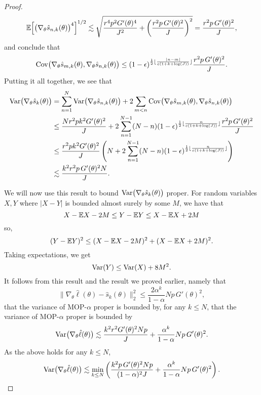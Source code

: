 \begin{proof}
\begin{equation}
\mathbb{E}\Big[\big(\nabla_\theta\hat s_{n,k}(\theta)\big)^4\Big]^{1/2} \lesssim  \sqrt{\frac{r^4p^2G'(\theta)^4}{J^2}+\left(\frac{r^2p \, G'(\theta)^2}{J}\right)^2} = \frac{r^2p \, G'(\theta)^2}{J},
\end{equation}
and conclude that 
\begin{equation}\mathrm{Cov}\big(\nabla_\theta\hat s_{m,k}(\theta), \nabla_\theta\hat s_{n,k}(\theta)\big) \leq (1-\epsilon)^{\frac{1}{2}\lfloor \frac{|n-m|}{c(1+k+\log(J))} \rfloor}\frac{r^2p \, G'(\theta)^2}{J}.\end{equation}
Putting it all together, we see that
\begin{align}
    \mathrm{Var}\big(\nabla_\theta \hat s_{k}(\theta)\big) &= \sum_{n=1}^N \mathrm{Var}\big(\nabla_\theta\hat s_{n,k}(\theta)\big) + 2\sum_{m<n} \mathrm{Cov}\big(\nabla_\theta\hat s_{m,k}(\theta),\nabla_\theta\hat s_{n,k}(\theta)\big)
    \\
    &\leq \frac{Nr^2pk^2G'(\theta)^2}{J} + 2\sum_{n=1}^{N-1} (N-n)(1-\epsilon)^{\frac{1}{2}\lfloor \frac{n}{c(1+k+\log(J))} \rfloor}\frac{r^2p \, G'(\theta)^2}{J} 
    \\
    &\leq \frac{r^2pk^2G'(\theta)^2}{J} \left(N + 2\sum_{n=1}^{N-1} (N-n) (1-\epsilon)^{\frac{1}{2}\lfloor \frac{n}{c(1+k+\log(J))} \rfloor}\right) 
    \\
    &\lesssim \frac{k^2r^2p \, G'(\theta)^2N}{J}.
\end{align}

We will now use this result to bound $\mathrm{Var}\big(\nabla_\theta \hat s_k(\theta)\big)$ proper. 
For random variables $X,Y$ where $|X-Y|$ is bounded almost surely by some $M$, we have that 
\begin{equation}
X-\mathbb{E} X - 2M \leq Y - \mathbb{E} Y \leq X - \mathbb{E} X + 2M\end{equation}
so,
\begin{equation}
(Y-\mathbb{E} Y)^2 \leq (X-\mathbb{E} X - 2M)^2 + (X-\mathbb{E} X +2M)^2.\end{equation}
Taking expectations, we get
\begin{equation}
\mathrm{Var}(Y) \leq \mathrm{Var}(X) + 8M^2.
\end{equation}
It follows from this result and the result we proved earlier, namely that
\begin{equation}
\big\|\nabla_\theta\hat\ell(\theta) - \hat s_k(\theta)\big\|_2^2 \leq \frac{2\alpha^k}{1-\alpha}Np \, G'(\theta)^2,
\end{equation}
that the variance of MOP-$\alpha$ proper is bounded by, for any $k \leq N$,
that the variance of MOP-$\alpha$ proper is bounded by
\begin{equation}
\mathrm{Var}\big(\nabla_\theta \hat\ell(\theta)\big) \lesssim \frac{k^2r^2G'(\theta)^2Np}{J} + \frac{\alpha^{k}}{1-\alpha}Np \, G'(\theta)^2.
\end{equation}
As the above holds for any $k \leq N$,
\begin{equation}
\mathrm{Var}\big(\nabla_\theta \hat\ell(\theta)\big) \lesssim \min_{k\leq N} \left(\frac{k^2p \, G'(\theta)^2Np}{(1-\alpha)^2J} + \frac{\alpha^{k}}{1-\alpha}Np \, G'(\theta)^2 \right).\end{equation}
\end{proof}


